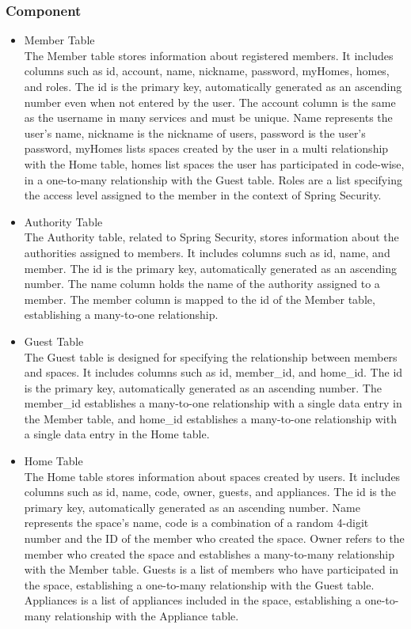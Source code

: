 \documentclass[conference]{IEEEtran}
\begin{document}
        \subsubsection{Component}
            \begin{itemize}
                \item Member Table\\
                The Member table stores information about registered members. It includes columns such as id, account, name, nickname, password, myHomes, homes, and roles. The id is the primary key, automatically generated as an ascending number even when not entered by the user. The account column is the same as the username in many services and must be unique. Name represents the user's name, nickname is  the nickname of users, password is the user's password, myHomes lists spaces created by the user in a multi relationship with the Home table, homes list spaces the user has participated in code-wise, in a one-to-many relationship with the Guest table. Roles are a list specifying the access level assigned to the member in the context of Spring Security.
                \vspace{3mm}
                \item Authority Table\\
                The Authority table, related to Spring Security, stores information about the authorities assigned to members. It includes columns such as id, name, and member. The id is the primary key, automatically generated as an ascending number. The name column holds the name of the authority assigned to a member. The member column is mapped to the id of the Member table, establishing a many-to-one relationship.
                \vspace{3mm}                
                \item Guest Table\\
                The Guest table is designed for specifying the relationship between members and spaces. It includes columns such as id, member\_id, and home\_id. The id is the primary key, automatically generated as an ascending number. The member\_id establishes a many-to-one relationship with a single data entry in the Member table, and home\_id establishes a many-to-one relationship with a single data entry in the Home table.
                \vspace{3mm}                
                \item Home Table\\
                The Home table stores information about spaces created by users. It includes columns such as id, name, code, owner, guests, and appliances. The id is the primary key, automatically generated as an ascending number. Name represents the space's name, code is a combination of a random 4-digit number and the ID of the member who created the space. Owner refers to the member who created the space and establishes a many-to-many relationship with the Member table. Guests is a list of members who have participated in the space, establishing a one-to-many relationship with the Guest table. Appliances is a list of appliances included in the space, establishing a one-to-many relationship with the Appliance table.

\end{itemize}
\end{document}
